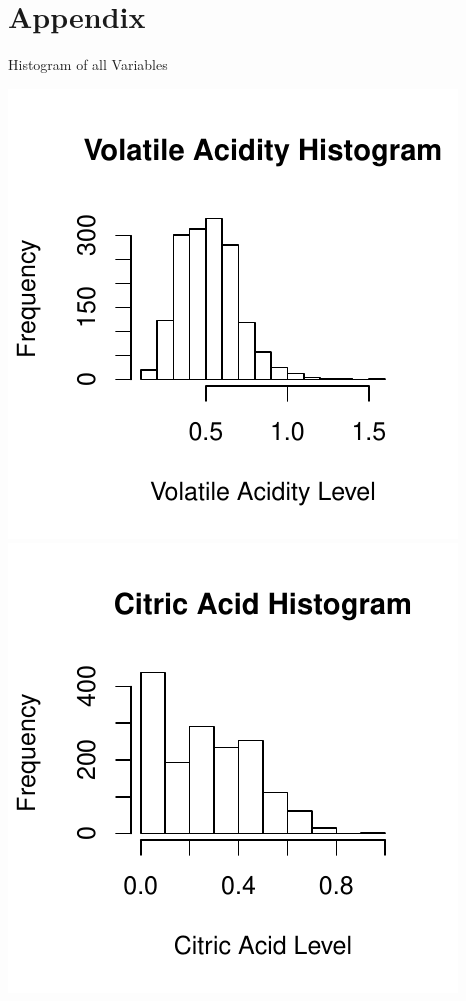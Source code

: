 \documentclass[]{article}
\begin{document}
\section{Appendix}\label{appendix}

Histogram of all Variables

\includegraphics{Project_files/figure-latex/unnamed-chunk-18-1.pdf}
\includegraphics{Project_files/figure-latex/unnamed-chunk-18-2.pdf}
\end{document}
